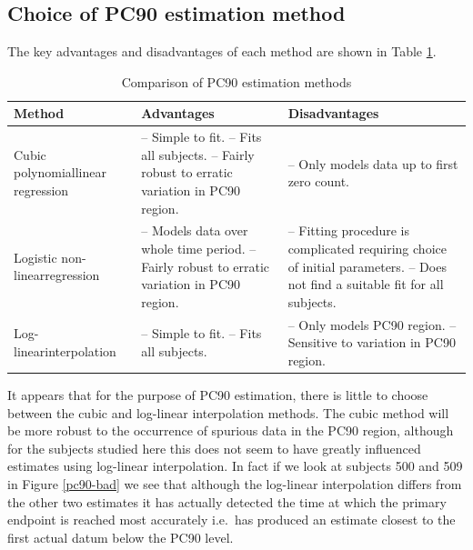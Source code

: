 \subsection{Choice of PC90 estimation method}
The key advantages and disadvantages of each method are shown in Table \ref{pc90compare}.
\begin{table}[h]
\centering
\caption{Comparison of PC90 estimation methods}\label{pc90compare}
\begin{tabular}{|m{1.4in}|m{2.0in}|m{2.0in}|}
\hline
Method&Advantages&Disadvantages\\\hline
Cubic polynomial\newline linear regression&
-- Simple to fit.\newline
-- Fits all subjects.\newline
-- Fairly robust to erratic variation in PC90 region.
&
-- Only models data up to first zero count.
\\\hline
Logistic non-linear\newline regression&
-- Models data over whole time period.\newline
-- Fairly robust to erratic variation in PC90 region.
&
-- Fitting procedure is complicated requiring choice of initial parameters.\newline
-- Does not find a suitable fit for all subjects.
\\\hline
Log-linear\newline interpolation&
-- Simple to fit.\newline
-- Fits all subjects.
&
-- Only models PC90 region.\newline
-- Sensitive to variation in PC90 region.
\\\hline
\end{tabular}
\end{table}

It appears that for the purpose of PC90 estimation, there is little to choose between the cubic and log-linear interpolation methods. The cubic method will be more robust to the occurrence of spurious data in the PC90 region, although for the subjects studied here this does not seem to have greatly influenced estimates using log-linear interpolation. In fact if we look at subjects 500 and 509 in Figure \ref{pc90-bad} we see that although the log-linear interpolation differs from the other two estimates it has actually detected the time at which the primary endpoint is reached most accurately i.e.\ has produced an estimate closest to the first actual datum below the PC90 level.

